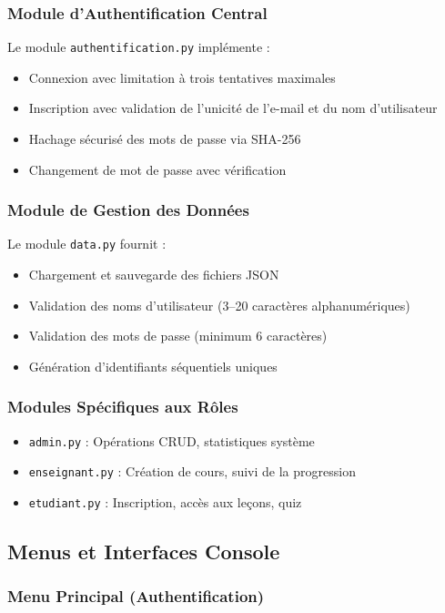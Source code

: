 \documentclass[12pt,a4paper]{article}
\begin{document}
\subsubsection{Module d'Authentification Central}
Le module \texttt{authentification.py} implémente :
\begin{itemize}
    \item Connexion avec limitation à trois tentatives maximales
    \item Inscription avec validation de l'unicité de l'e-mail et du nom d'utilisateur
    \item Hachage sécurisé des mots de passe via SHA-256
    \item Changement de mot de passe avec vérification
\end{itemize}

\subsubsection{Module de Gestion des Données}
Le module \texttt{data.py} fournit :
\begin{itemize}
    \item Chargement et sauvegarde des fichiers JSON
    \item Validation des noms d'utilisateur (3--20 caractères alphanumériques)
    \item Validation des mots de passe (minimum 6 caractères)
    \item Génération d'identifiants séquentiels uniques
\end{itemize}

\subsubsection{Modules Spécifiques aux Rôles}
\begin{itemize}
    \item \texttt{admin.py} : Opérations CRUD, statistiques système
    \item \texttt{enseignant.py} : Création de cours, suivi de la progression
    \item \texttt{etudiant.py} : Inscription, accès aux leçons, quiz
\end{itemize}

\subsection{Menus et Interfaces Console}

\subsubsection{Menu Principal (Authentification)}
\end{document}
